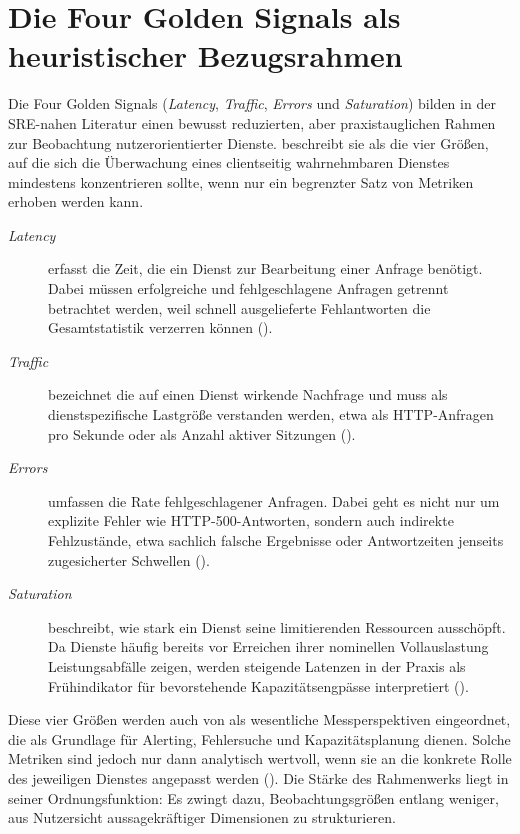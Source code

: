  
\section{Die Four Golden Signals als heuristischer Bezugsrahmen}
 
Die Four Golden Signals (\emph{Latency}, \emph{Traffic}, \emph{Errors} und \emph{Saturation}) bilden in der SRE-nahen Literatur einen bewusst reduzierten, aber praxistauglichen Rahmen zur Beobachtung nutzerorientierter Dienste. \textcite[S.~60]{ewaschukMonitoringDistributedSystems} beschreibt sie als die vier Größen, auf die sich die Überwachung eines clientseitig wahrnehmbaren Dienstes mindestens konzentrieren sollte, wenn nur ein begrenzter Satz von Metriken erhoben werden kann.
 
\begin{description}
  \item[\emph{Latency}] erfasst die Zeit, die ein Dienst zur Bearbeitung einer Anfrage benötigt. Dabei müssen erfolgreiche und fehlgeschlagene Anfragen getrennt betrachtet werden, weil schnell ausgelieferte Fehlantworten die Gesamtstatistik verzerren können (\cite[S.~60]{ewaschukMonitoringDistributedSystems}).
  \item[\emph{Traffic}] bezeichnet die auf einen Dienst wirkende Nachfrage und muss als dienstspezifische Lastgröße verstanden werden, etwa als HTTP-Anfragen pro Sekunde oder als Anzahl aktiver Sitzungen (\cite[S.~60]{ewaschukMonitoringDistributedSystems}).
  \item[\emph{Errors}] umfassen die Rate fehlgeschlagener Anfragen. Dabei geht es nicht nur um explizite Fehler wie HTTP-500-Antworten, sondern auch indirekte Fehlzustände, etwa sachlich falsche Ergebnisse oder Antwortzeiten jenseits zugesicherter Schwellen (\cite[S.~60]{ewaschukMonitoringDistributedSystems}).
  \item[\emph{Saturation}] beschreibt, wie stark ein Dienst seine limitierenden Ressourcen ausschöpft. Da Dienste häufig bereits vor Erreichen ihrer nominellen Vollauslastung Leistungsabfälle zeigen, werden steigende Latenzen in der Praxis als Frühindikator für bevorstehende Kapazitätsengpässe interpretiert (\cite[S.~60--61]{ewaschukMonitoringDistributedSystems}).
\end{description}
 
Diese vier Größen werden auch von \textcite[S.~86913--86914]{usman2022survey} als wesentliche Messperspektiven eingeordnet, die als Grundlage für Alerting, Fehlersuche und Kapazitätsplanung dienen. Solche Metriken sind jedoch nur dann analytisch wertvoll, wenn sie an die konkrete Rolle des jeweiligen Dienstes angepasst werden (\cite[S.~12]{albuquerque2025tracing}). Die Stärke des Rahmenwerks liegt in seiner Ordnungsfunktion: Es zwingt dazu, Beobachtungsgrößen entlang weniger, aus Nutzersicht aussagekräftiger Dimensionen zu strukturieren.
 
